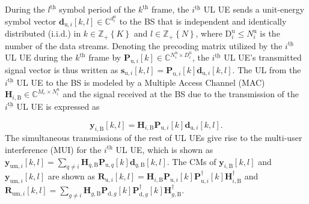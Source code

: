 \documentclass[9pt,journal]{IEEEtran}
\newcommand{\bracket}[1]{{\left [{#1}\right ]}}
\newcommand{\braces}[1]{{\left\{ {#1}\right\}}}
\newcommand{\ith}[1]    {{#1}^{\underline{\text{th}}}}
\newcommand{\cc}{_\mathrm{c}}
\newcommand{\B}{\textrm{B}}
\newcommand{\dui}{\mathbf{d}_{\textrm{u},i}\bracket{k,l}}
\newcommand{\PiB}{\mathbf{P}_{\textrm{u},i}\bracket{k}}
\newcommand{\PiBH}{\mathbf{P}^\dagger_{\textrm{u},i}\bracket{k}}
\newcommand{\PqB}{\mathbf{P}_{\textrm{u},q}\bracket{k}}
\newcommand{\PBg}{\mathbf{P}_{\textrm{d},g}\bracket{k}}
\newcommand{\PBgH}{\mathbf{P}^\dagger_{\textrm{d},g}\bracket{k}}
\newcommand{\HiB}{\mathbf{H}_{i,\textrm{B}}}
\newcommand{\HiBH}{\mathbf{H}^\dagger_{i,\textrm{B}}}
\begin{document}
During the $\ith{l}$ symbol period of the $\ith{k}$ frame, the $\ith{i}$ UL UE sends a unit-energy symbol vector $\mathbf{d}_{\textrm{u},i}\bracket{k,l}\in \mathbb{C}^{d^{\textrm{u}}_i}$ to the BS that is independent and identically distributed (i.i.d.) in $k\in\mathbb{Z}_+\braces{\mathit{K}}$ and $l\in\mathbb{Z}_+\braces{\mathit{N}}$, where $\mathrm{D}^\textrm{u}_i\leq \mathit{N}^{\textrm{u}}_i$ is the number of the data streams. Denoting the precoding matrix utilized by the $\ith{i}$ UL UE during the $\ith{k}$ frame by $\PiB\in\mathbb{C}^{\mathit{N}^{\textrm{u}}_i\times \mathit{D}^\textrm{u}_i}$, the $\ith{i}$ UL UE's transmitted signal vector is thus written as $\mathbf{s}_{\textrm{u},i}\bracket{k,l}=\PiB\mathbf{d}_{\textrm{u},i}\bracket{k,l}$. The UL from the $\ith{i}$ UL UE to the BS is modeled by a Multiple Access Channel (MAC) $\mathbf{H}_{i,\textrm{B}}\in\mathbb{C}^{\mathit{M}\cc\times \mathit{N}^{\textrm{u}}_i}$ and the signal received at the BS due to the transmission of the $\ith{i}$ UL UE is expressed as 
  \par\noindent\small
\begin{equation}
\label{ULFDcomm}
\mathbf{y}_{i,\textrm{B}}\bracket{k,l}=\mathbf{H}_{i,\textrm{B}}\PiB\dui.
\end{equation}
\normalsize
The simultaneous transmissions of the rest of UL UEs give rise to the multi-user interference (MUI) for the $\ith{i}$ UL UE, which is shown as  $\mathbf{y}_{\textrm{um},i}\bracket{k,l}=\sum_{q\neq i}\mathbf{H}_{q,\textrm{B}}\PqB\mathbf{d}_{q,\B}\bracket{k,l}$. The CMs of 
$\mathbf{y}_{i,\textrm{B}}\bracket{k,l}$ and $\mathbf{y}_{\textrm{um},i}\bracket{k,l}$ are shown as $\mathbf{R}_{\textrm{u},i}\bracket{k,l}=\HiB\PiB\PiBH\HiBH$ and
$\mathbf{R}_{\textrm{um},i}\bracket{k,l}=\sum_{g\neq i }\mathbf{H}_{g,\textrm{B}}\PBg\PBgH\mathbf{H}^\dagger_{g,\textrm{B}}$.
\end{document}
